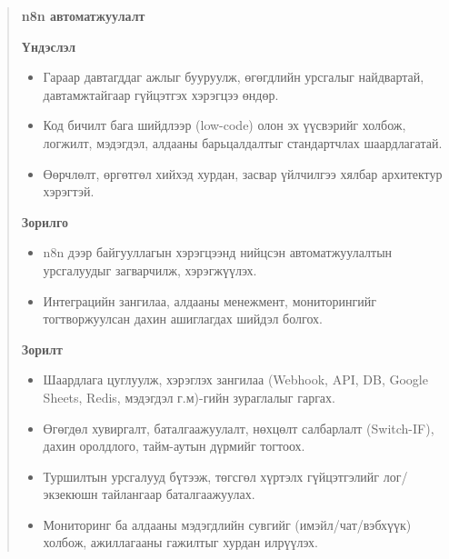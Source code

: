 \begin{abstract}
   \large{\textbf{n8n автоматжуулалт}} \par
   \textbf{Үндэслэл} \par
   \begin{itemize}
       \item Гараар давтагддаг ажлыг бууруулж, өгөгдлийн урсгалыг найдвартай, давтамжтайгаар гүйцэтгэх хэрэгцээ өндөр.
       \item Код бичилт бага шийдлээр (low-code) олон эх үүсвэрийг холбож, логжилт, мэдэгдэл, алдааны барьцалдалтыг стандартчлах шаардлагатай.
       \item Өөрчлөлт, өргөтгөл хийхэд хурдан, засвар үйлчилгээ хялбар архитектур хэрэгтэй.
   \end{itemize}
   \textbf{Зорилго} \par
   \begin{itemize}
       \item n8n дээр байгууллагын хэрэгцээнд нийцсэн автоматжуулалтын урсгалуудыг загварчилж, хэрэгжүүлэх.
        \item Интеграцийн зангилаа, алдааны менежмент, мониторингийг тогтворжуулсан дахин ашиглагдах шийдэл болгох.
   \end{itemize}

    \textbf{Зорилт} \par
    \begin{itemize}
       \item Шаардлага цуглуулж, хэрэглэх зангилаа (Webhook, API, DB, Google Sheets, Redis, мэдэгдэл г.м)-гийн зураглалыг гаргах.
       \item Өгөгдөл хувиргалт, баталгаажуулалт, нөхцөлт салбарлалт (Switch-IF), дахин оролдлого, тайм-аутын дүрмийг тогтоох.
       \item Туршилтын урсгалууд бүтээж, төгсгөл хүртэлх гүйцэтгэлийг лог/экзекюшн тайлангаар баталгаажуулах.
       \item Мониторинг ба алдааны мэдэгдлийн сувгийг (имэйл/чат/вэбхүүк) холбож, ажиллагааны гажилтыг хурдан илрүүлэх.
   \end{itemize}


\end{abstract}